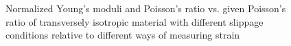 \documentclass[3p]{elsarticle}
\begin{document}
\begin{center}
\begin{figure}[h]

\caption{Normalized Young's moduli and Poisson's ratio vs. given Poisson's ratio
of transversely isotropic material with different slippage conditions relative
to different ways of measuring strain}
\label{fig:strainmethods}


\end{figure}
\end{center}
\end{document}
